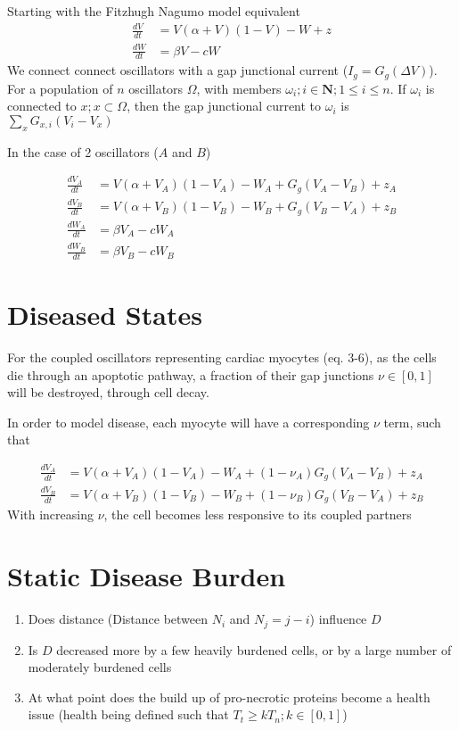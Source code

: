 \documentclass[11pt]{report}
\begin{document}
Starting with the Fitzhugh Nagumo model equivalent
\begin{align}
\frac{dV}{dt} &= V(\alpha +V)(1-V) -W +z\\
\frac{dW}{dt} &= \beta V - cW
\end{align}
We connect connect oscillators with a gap junctional current ($I_g = G_g(\Delta V)$). For a population of $n$ oscillators $\Omega$, with members $\omega_i; i\in \textbf{N}; 1\leq i\leq n$. If $\omega_i$ is connected to $x; x\subset\Omega$, then the gap junctional current to $\omega_i$ is $\sum_{x} G_{x,i}(V_i-V_x)$

In the case of 2 oscillators ($A$ and $B$)

\begin{align}
\frac{dV_A}{dt} &= V(\alpha +V_A)(1-V_A) -W_A + G_g(V_A-V_B) + z_A\\
\frac{dV_B}{dt} &= V(\alpha +V_B)(1-V_B) -W_B + G_g(V_B-V_A) +z_B\\
\frac{dW_A}{dt} &= \beta V_A - cW_A\\
\frac{dW_B}{dt} &= \beta V_B - cW_B
\end{align}

\section{Diseased States}
For the coupled oscillators representing cardiac myocytes (eq. 3-6), as the cells die through an apoptotic pathway, a fraction of their gap junctions $\nu \in [0,1]$ will be destroyed, through cell decay.

In order to model disease, each myocyte will have a corresponding $\nu$ term, such that

\begin{align}
\frac{dV_A}{dt} &= V(\alpha +V_A)(1-V_A) -W_A + (1-\nu_A) G_g(V_A-V_B) + z_A\\
\frac{dV_B}{dt} &= V(\alpha +V_B)(1-V_B) -W_B + (1-\nu_B) G_g(V_B-V_A) +z_B
\end{align}
With increasing $\nu$, the cell becomes less responsive to its coupled partners

\section{Static Disease Burden} %
\label{sub:static_disease_burden}

\begin{enumerate}
	\item Does distance (Distance between $N_i$ and $N_j= j -i$) influence $D$
	\item Is $D$ decreased more by a few heavily burdened cells, or by a large number of moderately burdened cells
	\item At what point does the build up of pro-necrotic proteins become a health issue (health being defined such that $T_t \geq kT_n; k\in[0,1]$)
\end{enumerate}
\end{document}
